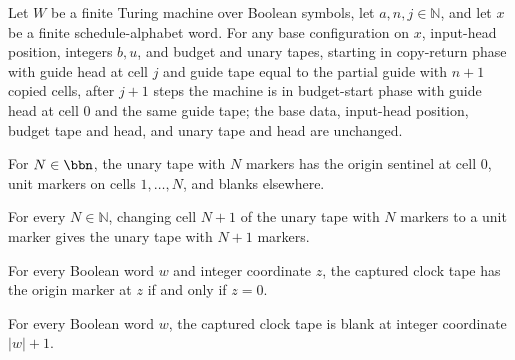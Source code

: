 \begin{lemma}
\label{Complexity.setupCfg_copy_return}
\leanok
{}
Let $W$ be a finite Turing machine over Boolean symbols, let $a,n,j\in\mathbb{N}$, and
let $x$ be a finite schedule-alphabet word. For any base configuration on $x$,
input-head position, integers $b,u$, and budget and unary tapes, starting in copy-return
phase with guide head at cell $j$ and guide tape equal to the partial guide with $n+1$
copied cells, after $j+1$ steps the machine is in budget-start phase with guide head at
cell $0$ and the same guide tape; the base data, input-head position, budget tape and
head, and unary tape and head are unchanged.
\end{lemma}

\begin{definition}
\label{Complexity.unaryTape}
\leanok
{}
For $N \in \bbn$, the unary tape with $N$ markers has the origin sentinel at cell $0$,
unit markers on cells $1,\dots,N$, and blanks elsewhere.
\end{definition}

\begin{lemma}
\label{Complexity.unaryTape_next}
\leanok
{}
For every $N\in\mathbb{N}$, changing cell $N+1$ of the unary tape with $N$ markers to a
unit marker gives the unary tape with $N+1$ markers.
\end{lemma}

\begin{lemma}
\label{Complexity.clockTape_origin}
\leanok
{}
For every Boolean word $w$ and integer coordinate $z$, the captured clock tape has the
origin marker at $z$ if and only if $z=0$.
\end{lemma}

\begin{lemma}
\label{Complexity.clockTape_end}
\leanok
{}
For every Boolean word $w$, the captured clock tape is blank at integer coordinate
$|w|+1$.
\end{lemma}

